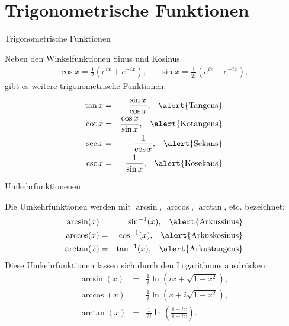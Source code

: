 \documentclass[german]{beamer}
\newcommand{\bq}{\begin{eqnarray*}}
\newcommand{\eq}{\end{eqnarray*}}
\begin{document}

\section{Trigonometrische Funktionen}

\frame{\sectionpage}

\begin{frame}{Trigonometrische Funktionen}

Neben den Winkelfunktionen \alert{Sinus} und \alert{Kosinus}
\bq
 \cos x = \frac{1}{2} \left( e^{ix} + e^{-ix} \right),
 & &
 \sin x = \frac{1}{2i} \left( e^{ix} - e^{-ix} \right),
\eq
gibt es weitere trigonometrische Funktionen:
\bq
 \tan x & = & \frac{\sin x}{\cos x}, \;\;\;\alert{\mbox{Tangens}}
 \nonumber \\
 \cot x & = & \frac{\cos x}{\sin x}, \;\;\;\alert{\mbox{Kotangens}}
 \nonumber \\
 \sec x & = & \frac{1}{\cos x}, \;\;\;\alert{\mbox{Sekans}}
 \nonumber \\
 \csc x & = & \frac{1}{\sin x}, \;\;\;\alert{\mbox{Kosekans}}
\eq

\end{frame}

\begin{frame}{Umkehrfunktionenen}

Die Umkehrfunktionen werden mit $\arcsin$, $\arccos$, $\arctan$, etc. bezeichnet:
\bq
 \arcsin(x) & = & \sin^{-1}(x), \;\;\;\alert{\mbox{Arkussinus}}
 \nonumber \\
 \arccos(x) & = & \cos^{-1}(x), \;\;\;\alert{\mbox{Arkuskosinus}}
 \nonumber \\
 \arctan(x) & = & \tan^{-1}(x), \;\;\;\alert{\mbox{Arkustangens}}
\eq
Diese Umkehrfunktionen lassen sich durch den Logarithmus ausdr\"ucken:
\bq
 \arcsin(x) & = & \frac{1}{i} \ln\left( i x + \sqrt{1-x^2} \right),
 \nonumber \\
 \arccos(x) & = & \frac{1}{i} \ln\left( x + i \sqrt{1-x^2} \right),
 \nonumber \\
 \arctan(x) & = & \frac{1}{2i} \ln\left(\frac{1+ix}{1-ix}\right).
\eq

\end{frame}
\end{document}
